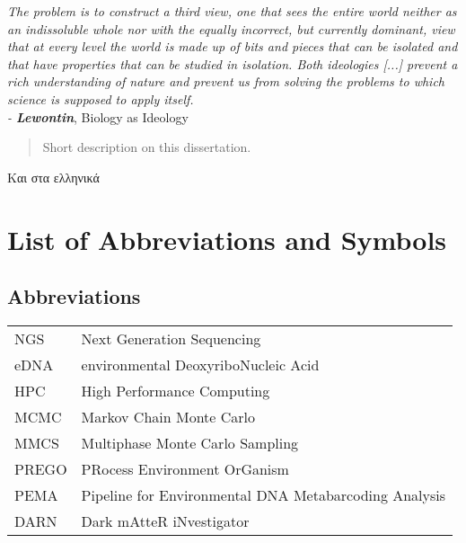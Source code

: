 \documentclass[master=elt, cleveref, autoref, masteroption=eg]{kulemt}
\begin{document}
\begin{preface}
  
   \textit{The problem is to construct a third view, one that sees the entire world neither as an indissoluble whole nor with the equally incorrect, but currently dominant, view that at every level the world is made up of bits and pieces that can be isolated and that have properties that can be studied in isolation. Both ideologies [...] prevent a rich understanding of nature and prevent us from solving the problems to which science is supposed to apply itself. \\
   - \textbf{Lewontin}}, Biology as Ideology
  
\end{preface}


\tableofcontents
\newpage

\begin{abstract}

   Short description on this dissertation.

\end{abstract}


\begin{abstract*}

   Και στα ελληνικά
   
\end{abstract*}

\listoffiguresandtables

\chapter{List of Abbreviations and Symbols}

\section*{Abbreviations}
\begin{flushleft}
  \renewcommand{\arraystretch}{1.1}
  \begin{tabularx}{\textwidth}{@{}p{12mm}X@{}}
    NGS   & Next Generation Sequencing \\
    eDNA  & environmental DeoxyriboNucleic Acid \\
    HPC   & High Performance Computing \\
    MCMC  & Markov Chain Monte Carlo \\
    MMCS  & Multiphase Monte Carlo Sampling \\
    PREGO & PRocess Environment OrGanism \\
    PEMA  & Pipeline for Environmental DNA Metabarcoding Analysis \\
    DARN  & Dark mAtteR iNvestigator \\
    
  \end{tabularx}
\end{flushleft}
\end{document}

